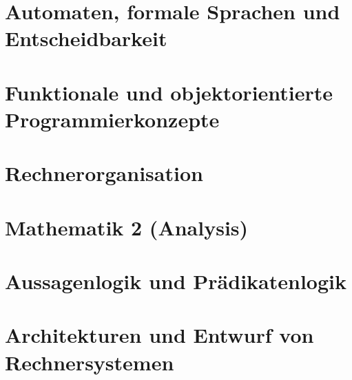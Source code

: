 \documentclass[english, notodo]{fdsummary}
\subtitle{Bachelor of Science (Part 1)}
\newcommand{\lstbasepath}{unset}
\begin{document}
	\maketitle
	\tableofcontents

	\cleardoublepage
	\part{Automaten, formale Sprachen und Entscheidbarkeit}
	\graphicspath{{./cs/mandatory/fs1/afe/}}
	\renewcommand{\lstbasepath}{./cs/mandatory/fs1/afe}
	

	\cleardoublepage
	\part{Funktionale und objektorientierte Programmierkonzepte}
	\graphicspath{{./cs/mandatory/fs1/fop/}}
	\renewcommand{\lstbasepath}{./cs/mandatory/fs1/fop}
	

	\cleardoublepage
	\part{Rechnerorganisation}
	\graphicspath{{./cs/mandatory/fs2/ro/}}
	\renewcommand{\lstbasepath}{./cs/mandatory/fs2/ro}
	

	\cleardoublepage
	\part{Mathematik 2 (Analysis)}
	\graphicspath{{./cs/mandatory/fs2/mathe2/}}
	\renewcommand{\lstbasepath}{./cs/mandatory/fs2/mathe2}
	

	\cleardoublepage
	\part{Aussagenlogik und Prädikatenlogik}
	\graphicspath{{./cs/mandatory/fs2/apl/}}
	\renewcommand{\lstbasepath}{./cs/mandatory/fs2/apl}
	

	\cleardoublepage
	\part{Architekturen und Entwurf von Rechnersystemen}
	\graphicspath{{./cs/mandatory/fs3/aer/}}
	\renewcommand{\lstbasepath}{./cs/mandatory/fs3/aer}
	
\end{document}
